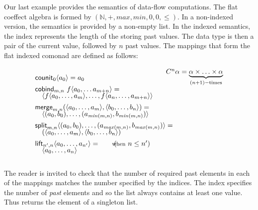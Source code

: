 \begin{example}
Our last example provides the semantics of data-flow computations. The flat coeffect algebra 
is formed by $(\mathbb{N}, +, \mathit{max}, \mathit{min}, 0, 0, \leq)$. In a 
non-indexed version, the semantics is provided by a non-empty list. In the indexed semantics,
the index represents the length of the storing past values. The data type is then a pair of 
the current value, followed by $n$ past values. The mappings that form the flat indexed comonad 
are defined as follows:

\begin{equation*}
\begin{array}{l}
\ident{counit}_{0}\langle a_0 \rangle = a_0
\\[0.45em]
\ident{cobind}_{m, n}~f \langle a_0, \ldots a_{m+n} \rangle = \\[-0.25em]
\quad \langle f \langle a_0, \ldots, a_m \rangle, \ldots, f \langle a_{n}, \ldots, a_{m+n} \rangle \rangle
\\[0.45em]
\ident{merge}_{m, n} (\langle a_0, \ldots, a_m \rangle, \langle b_0, \ldots, b_n\rangle) = \\[-0.25em]
\quad \langle (a_0, b_0), \ldots, (a_{\mathit{min}(m,n)}, b_{\mathit{min}(m,n)}) \rangle
\\[0.45em]
\ident{split}_{m, n} \langle (a_0, b_0), \ldots, (a_{\mathit{max}(m,n)}, b_{\mathit{max}(m,n)}) \rangle = \\[-0.25em]
\quad (\langle a_0, \ldots, a_m \rangle, \langle b_0, \ldots, b_n\rangle)
\\[0.45em]
\ident{lift}_{n', n} \langle a_0, \ldots, a_{n'} \rangle = \qquad(\hspace{-0.95em}\textnormal{\footnotesize when}~n\leq n') \\[-0.25em]
\quad \langle a_0, \ldots, a_n \rangle
\end{array}
\begin{array}{l}
\hspace{-2em}\ctyp{n}{\alpha} = \underbrace{\alpha \times \ldots \times \alpha}_{(n+1)-\textnormal{times}}\\[11em]
~\\
\end{array}
\end{equation*}
\end{example}

\noindent
The reader is invited to check that the number of required past elements in each of the mappings
matches the number specified by the indices. The index specifies the number of \emph{past} elements
and so the list always contains at least one value. Thus  returns the element of a
singleton list.

